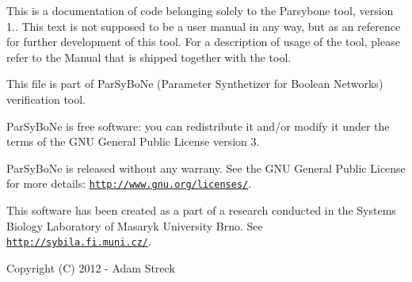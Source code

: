 \-This is a documentation of code belonging solely to the \-Parsybone tool, version 1.. \-This text is not supposed to be a user manual in any way, but as an reference for further development of this tool. \-For a description of usage of the tool, please refer to the \-Manual that is shipped together with the tool.

\-This file is part of \-Par\-Sy\-Bo\-Ne (\-Parameter \-Synthetizer for \-Boolean \-Networks) verification tool. \par
 \-Par\-Sy\-Bo\-Ne is free software\-: you can redistribute it and/or modify it under the terms of the \-G\-N\-U \-General \-Public \-License version 3. \par
 \-Par\-Sy\-Bo\-Ne is released without any warrany. \-See the \-G\-N\-U \-General \-Public \-License for more details\-: \href{http://www.gnu.org/licenses/}{\tt http\-://www.\-gnu.\-org/licenses/}. \par
 \-This software has been created as a part of a research conducted in the \-Systems \-Biology \-Laboratory of \-Masaryk \-University \-Brno. \-See \href{http://sybila.fi.muni.cz/}{\tt http\-://sybila.\-fi.\-muni.\-cz/}. \par
 \-Copyright (\-C) 2012 -\/ \-Adam \-Streck 